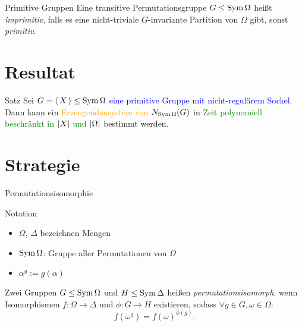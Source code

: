 
\begin{frame}{Primitive Gruppen}
Eine transitive Permutationsgruppe $G \leq \operatorname{Sym} \Omega$ heißt
\emph{imprimitiv},
\pause
falls es eine nicht-triviale
$G$-invariante Partition von $\Omega$ gibt,
\pause
sonst \emph{primitiv}.

\pause
{}
\end{frame}


\section{Resultat}
\begin{frame}%
\begin{block}{Satz}
Sei \textcolor{blue}{$G =  \left\langle \, X \, \right\rangle  \leq \operatorname{Sym} \Omega$ eine primitive Gruppe
mit nicht-regulärem Sockel}.
\pause
Dann kann ein
\textcolor{orange}{Erzeugendensystem von $N_{\operatorname{Sym} \Omega}(G)$}
\pause
in
\textcolor{green}{Zeit polynomiell beschränkt in $ \left| X \right| $ und $ \left| \Omega \right| $} bestimmt werden.
\end{block}
\end{frame}


\section{Strategie}
\begin{frame}{Permutationsisomorphie}
\begin{block}{Notation}
\begin{itemize}
\item
$\Omega$, $\Delta$ bezeichnen Mengen
\item
$\operatorname{Sym} \Omega$:
Gruppe aller Permutationen von $\Omega$
\item
$\alpha ^ g := g(\alpha)$
\end{itemize}
\end{block}

Zwei Gruppen $G \leq \operatorname{Sym} \Omega$ und $H \leq \operatorname{Sym} \Delta$ heißen
\emph{permutationsisomorph}, wenn
Isomorphismen $f : \Omega \to \Delta$ und $\phi : G \to H$ existieren,
sodass
$\forall g \in G, \omega \in \Omega$:
\[
    f( \omega ^ g ) = f(\omega) ^ {\phi(g)}.
\]
\end{frame}

